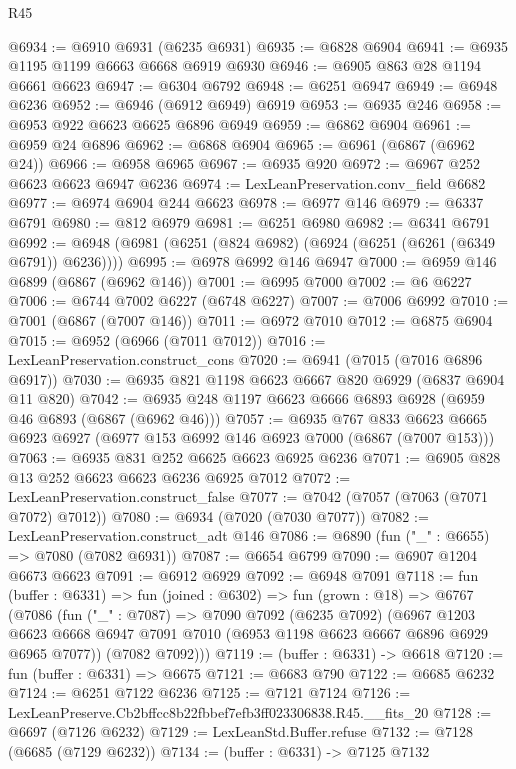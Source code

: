\begin{lexlean}{R45}
\begin{coremodule}
{@6934 := @6910 @6931 (@6235 @6931)
@6935 := @6828 @6904
@6941 := @6935 @1195 @1199 @6663 @6668 @6919 @6930
@6946 := @6905 @863 @28 @1194 @6661 @6623
@6947 := @6304 @6792
@6948 := @6251 @6947
@6949 := @6948 @6236
@6952 := @6946 (@6912 @6949) @6919
@6953 := @6935 @246
@6958 := @6953 @922 @6623 @6625 @6896 @6949
@6959 := @6862 @6904
@6961 := @6959 @24 @6896
@6962 := @6868 @6904
@6965 := @6961 (@6867 (@6962 @24))
@6966 := @6958 @6965
@6967 := @6935 @920
@6972 := @6967 @252 @6623 @6623 @6947 @6236
@6974 := LexLeanPreservation.conv_field @6682
@6977 := @6974 @6904 @244 @6623
@6978 := @6977 @146
@6979 := @6337 @6791
@6980 := @812 @6979
@6981 := @6251 @6980
@6982 := @6341 @6791
@6992 := @6948 (@6981 (@6251 (@824 @6982) (@6924 (@6251 (@6261 (@6349 @6791)) @6236))))
@6995 := @6978 @6992 @146 @6947
@7000 := @6959 @146 @6899 (@6867 (@6962 @146))
@7001 := @6995 @7000
@7002 := @6 @6227
@7006 := @6744 @7002 @6227 (@6748 @6227)
@7007 := @7006 @6992
@7010 := @7001 (@6867 (@7007 @146))
@7011 := @6972 @7010
@7012 := @6875 @6904
@7015 := @6952 (@6966 (@7011 @7012))
@7016 := LexLeanPreservation.construct_cons
@7020 := @6941 (@7015 (@7016 @6896 @6917))
@7030 := @6935 @821 @1198 @6623 @6667 @820 @6929 (@6837 @6904 @11 @820)
@7042 := @6935 @248 @1197 @6623 @6666 @6893 @6928 (@6959 @46 @6893 (@6867 (@6962 @46)))
@7057 := @6935
    @767
    @833
    @6623
    @6665
    @6923
    @6927
    (@6977 @153 @6992 @146 @6923 @7000 (@6867 (@7007 @153)))
@7063 := @6935 @831 @252 @6625 @6623 @6925 @6236
@7071 := @6905 @828 @13 @252 @6623 @6623 @6236 @6925 @7012
@7072 := LexLeanPreservation.construct_false
@7077 := @7042 (@7057 (@7063 (@7071 @7072) @7012))
@7080 := @6934 (@7020 (@7030 @7077))
@7082 := LexLeanPreservation.construct_adt @146
@7086 := @6890 (fun ("_" : @6655) => @7080 (@7082 @6931))
@7087 := @6654 @6799
@7090 := @6907 @1204 @6673 @6623
@7091 := @6912 @6929
@7092 := @6948 @7091
@7118 := fun (buffer : @6331) =>
  fun (joined : @6302) =>
  fun (grown : @18) =>
  @6767
    (@7086
      (fun ("_" : @7087) =>
      @7090
        @7092
        (@6235 @7092)
        (@6967
          @1203
          @6623
          @6668
          @6947
          @7091
          @7010
          (@6953 @1198 @6623 @6667 @6896 @6929 @6965 @7077))
        (@7082 @7092)))
@7119 := (buffer : @6331) -> @6618
@7120 := fun (buffer : @6331) => @6675
@7121 := @6683 @790
@7122 := @6685 @6232
@7124 := @6251 @7122 @6236
@7125 := @7121 @7124
@7126 := LexLeanPreserve.Cb2bffcc8b22fbbef7efb3ff023306838.R45.__fits_20
@7128 := @6697 (@7126 @6232)
@7129 := LexLeanStd.Buffer.refuse
@7132 := @7128 (@6685 (@7129 @6232))
@7134 := (buffer : @6331) -> @7125 @7132
}
\end{coremodule}
\end{lexlean}
